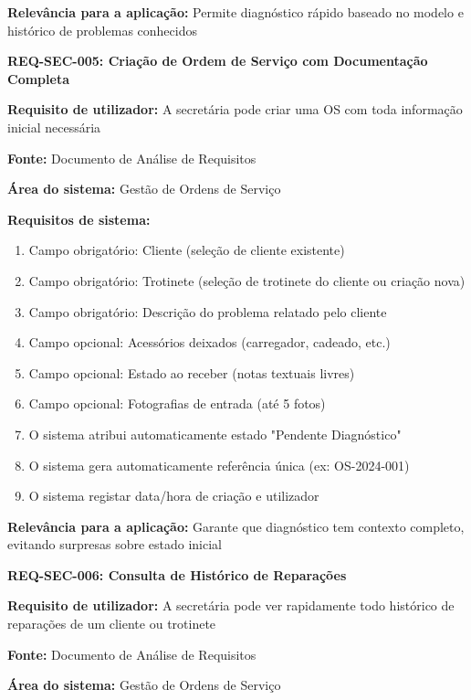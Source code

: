 \documentclass[11pt,a4paper]{article}
\newcommand{\reqheader}[1]{{\noindent\large\bfseries\color{sectionblue}#1}\par\vspace{0.3cm}}
\newcommand{\reqfield}[2]{{\noindent\textbf{#1:} #2}\par\vspace{0.2cm}}
\begin{document}
\reqfield{Relevância para a aplicação}{Permite diagnóstico rápido baseado no modelo e histórico de problemas conhecidos}

\vspace{0.8cm}

\reqheader{REQ-SEC-005: Criação de Ordem de Serviço com Documentação Completa}

\reqfield{Requisito de utilizador}{A secretária pode criar uma OS com toda informação inicial necessária}

\reqfield{Fonte}{Documento de Análise de Requisitos}

\reqfield{Área do sistema}{Gestão de Ordens de Serviço}

\reqfield{Requisitos de sistema}{
	\begin{enumerate}
		\item Campo obrigatório: Cliente (seleção de cliente existente)
		\item Campo obrigatório: Trotinete (seleção de trotinete do cliente ou criação nova)
		\item Campo obrigatório: Descrição do problema relatado pelo cliente
		\item Campo opcional: Acessórios deixados (carregador, cadeado, etc.)
		\item Campo opcional: Estado ao receber (notas textuais livres)
		\item Campo opcional: Fotografias de entrada (até 5 fotos)
		\item O sistema atribui automaticamente estado "Pendente Diagnóstico"
		\item O sistema gera automaticamente referência única (ex: OS-2024-001)
		\item O sistema registar data/hora de criação e utilizador
	\end{enumerate}
}

\reqfield{Relevância para a aplicação}{Garante que diagnóstico tem contexto completo, evitando surpresas sobre estado inicial}

\vspace{0.8cm}

\reqheader{REQ-SEC-006: Consulta de Histórico de Reparações}

\reqfield{Requisito de utilizador}{A secretária pode ver rapidamente todo histórico de reparações de um cliente ou trotinete}

\reqfield{Fonte}{Documento de Análise de Requisitos}

\reqfield{Área do sistema}{Gestão de Ordens de Serviço}
\end{document}
